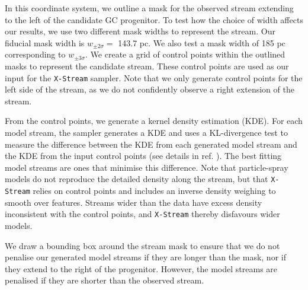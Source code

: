 \documentclass[pdflatex,sn-mathphys-num]{sn-jnl}
\theoremstyle{thmstyleone}
\theoremstyle{thmstyletwo}
\theoremstyle{thmstylethree}
\begin{document}
In this coordinate system, we outline a mask for the observed stream extending to the left of the candidate GC progenitor.
To test how the choice of width affects our results, we use two different mask widths to represent the stream. Our fiducial mask width is $w_{\pm2\sigma}=$ 143.7 pc. We also test a mask width of 185 pc corresponding to $w_{\pm3\sigma}$.
We create a grid of control points within the outlined masks to represent the candidate stream. These control points are used as our input for the \texttt{X-Stream} sampler. Note that we only generate control points for the left side of the stream, as we do not confidently observe a right extension of the stream.

From the control points, we generate a kernel density estimation (KDE). For each model stream, the sampler generates a KDE and uses a KL-divergence test \citep{kullback1951, Sanderson2015} to measure the difference between the KDE from each generated model stream and the KDE from the input control points (see details in ref. \citep[][]{NibPear2025}).
The best fitting model streams are ones that minimise this difference. Note that particle-spray models do not reproduce the detailed density along the stream, but that \texttt{X-Stream} relies on control points and includes an inverse density weighing to smooth over features. Streams wider than the data have excess density inconsistent with the control points, and \texttt{X-Stream} thereby disfavours wider models.

We draw a bounding box around the stream mask to ensure that we do not penalise our generated model streams if they are longer than the mask, nor if they extend to the right of the progenitor. However, the model streams are penalised if they are shorter than the observed stream.
\end{document}
